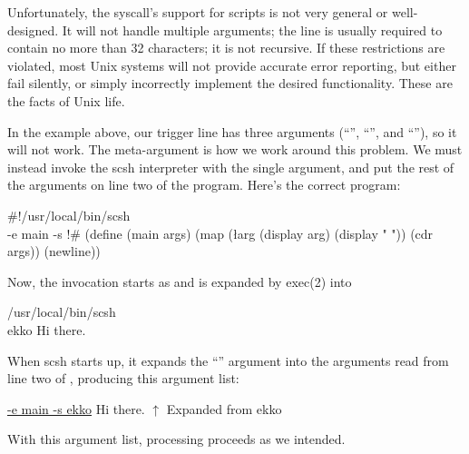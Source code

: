 Unfortunately, the {\Unix}  syscall's support for scripts is
not very general or well-designed.
It will not handle multiple arguments;
the \ex{\#!} line is usually required to contain no more than 32 characters;
it is not recursive.
If these restrictions are violated, most Unix systems will not provide accurate
error reporting, but either fail silently, or simply incorrectly implement
the desired functionality.
These are the facts of Unix life.

In the  example above, our \ex{\#!} trigger line has three
arguments (``'', ``'', and ``''), so it will not
work.
The meta-argument is how we work around this problem.
We must instead invoke the scsh interpreter with the single \cd{\\} argument,
and put the rest of the arguments on line two of the program. 
Here's the correct program:
%
\begin{code}
#!/usr/local/bin/scsh \\
-e main -s
!#
(define (main args) 
  (map (\l{arg} (display arg) (display " "))
       (cdr args))
  (newline))\end{code}
%
Now, the invocation starts as
and is expanded by exec(2) into
\begin{code}    
/usr/local/bin/scsh \\ ekko Hi there.\end{code}
When scsh starts up, it expands the ``\cd{\\}'' argument into the arguments
read from line two of , producing this argument list:
\begin{code}\cddollar
\underline{-e main -s ekko} Hi there.
        $\uparrow$
{\rm{}Expanded from} \cd{\\} ekko\end{code}
%
With this argument list, processing proceeds as we intended.

